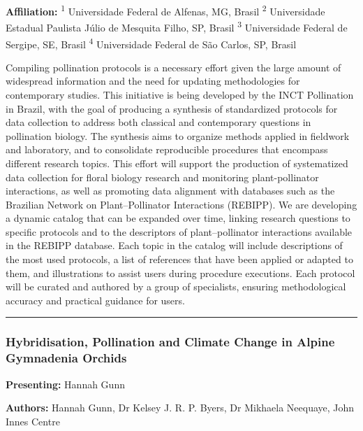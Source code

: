 \documentclass[
  letterpaper,
  DIV=11,
  numbers=noendperiod]{scrartcl}
\begin{document}
\textbf{Affiliation:} \textsuperscript{1} Universidade Federal de
Alfenas, MG, Brasil \textsuperscript{2} Universidade Estadual Paulista
Júlio de Mesquita Filho, SP, Brasil \textsuperscript{3} Universidade
Federal de Sergipe, SE, Brasil \textsuperscript{4} Universidade Federal
de São Carlos, SP, Brasil

Compiling pollination protocols is a necessary effort given the large
amount of widespread information and the need for updating methodologies
for contemporary studies. This initiative is being developed by the INCT
Pollination in Brazil, with the goal of producing a synthesis of
standardized protocols for data collection to address both classical and
contemporary questions in pollination biology. The synthesis aims to
organize methods applied in fieldwork and laboratory, and to consolidate
reproducible procedures that encompass different research topics. This
effort will support the production of systematized data collection for
floral biology research and monitoring plant-pollinator interactions, as
well as promoting data alignment with databases such as the Brazilian
Network on Plant--Pollinator Interactions (REBIPP). We are developing a
dynamic catalog that can be expanded over time, linking research
questions to specific protocols and to the descriptors of
plant--pollinator interactions available in the REBIPP database. Each
topic in the catalog will include descriptions of the most used
protocols, a list of references that have been applied or adapted to
them, and illustrations to assist users during procedure executions.
Each protocol will be curated and authored by a group of specialists,
ensuring methodological accuracy and practical guidance for users.

\begin{center}\rule{0.5\linewidth}{0.5pt}\end{center}

\subsubsection{Hybridisation, Pollination and Climate Change in Alpine
Gymnadenia
Orchids}\label{hybridisation-pollination-and-climate-change-in-alpine-gymnadenia-orchids}

\textbf{Presenting:} Hannah Gunn

\textbf{Authors:} Hannah Gunn, Dr Kelsey J. R. P. Byers, Dr Mikhaela
Neequaye, John Innes Centre
\end{document}
